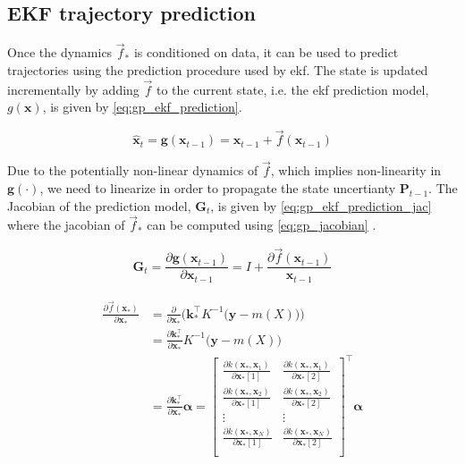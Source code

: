 \subsection{EKF trajectory prediction}
Once the dynamics $\vec{f}_*$ is conditioned on data, it can be used to predict trajectories using the prediction procedure used by \acrshort{ekf}. 
The state is updated incrementally by adding $\vec{f}$ to the current state, i.e. the \acrshort{ekf} prediction model, $g(\boldsymbol{x})$, is given by \cref{eq:gp_ekf_prediction}.

\begin{equation}\label{eq:gp_ekf_prediction}
    \hat{\boldsymbol{x}}_{t} = \boldsymbol{g}(\boldsymbol{x}_{t-1}) = \boldsymbol{x}_{t-1} + \vec{f}(\boldsymbol{x}_{t-1})
\end{equation}

Due to the potentially non-linear dynamics of $\vec{f}$, which implies non-linearity in $\boldsymbol{g}(\cdot)$, we need to linearize in order to propagate the state uncertianty $\boldsymbol{P}_{t-1}$. The Jacobian of the prediction model, $\boldsymbol{G}_t$, is given by \cref{eq:gp_ekf_prediction_jac} where the jacobian of $\vec{f}_*$ can be computed using \cref{eq:gp_jacobian} \cite{gpekf}. 

\begin{equation}\label{eq:gp_ekf_prediction_jac}
    \boldsymbol{G}_t = \frac{\partial \boldsymbol{g}(\boldsymbol{x}_{t-1})}{\partial \boldsymbol{x}_{t-1}} = I + \frac{\partial \vec{f}(\boldsymbol{x}_{t-1})}{\boldsymbol{x}_{t-1}}
\end{equation}

\begin{align}\label{eq:gp_jacobian}
    \begin{split}
        \frac{\partial \vec{f}(\boldsymbol{x}_*)}{\partial \boldsymbol{x}_*} &= \frac{\partial}{\partial \boldsymbol{x}_*} \bigg(\boldsymbol{k}_*^\intercal K^{-1} \big(\boldsymbol{y} - m(X)\big)\bigg)\\
        &= \frac{\partial \boldsymbol{k}_*^\intercal}{\partial \boldsymbol{x}_*} K^{-1} \big(\boldsymbol{y} - m(X)\big)\\
        &= \frac{\partial \boldsymbol{k}_*^\intercal}{\partial \boldsymbol{x}_*} \boldsymbol{\alpha} = \begin{bmatrix}
            \frac{\partial k(\boldsymbol{x}_*, \boldsymbol{x}_1)}{\partial \boldsymbol{x}_*[1]} & \frac{\partial k(\boldsymbol{x}_*, \boldsymbol{x}_1)}{\partial \boldsymbol{x}_*[2]} \\
            \frac{\partial k(\boldsymbol{x}_*, \boldsymbol{x}_2)}{\partial \boldsymbol{x}_*[1]} & \frac{\partial k(\boldsymbol{x}_*, \boldsymbol{x}_2)}{\partial \boldsymbol{x}_*[2]} \\
            \vdots & \vdots \\
            \frac{\partial k(\boldsymbol{x}_*, \boldsymbol{x}_N)}{\partial \boldsymbol{x}_*[1]} & \frac{\partial k(\boldsymbol{x}_*, \boldsymbol{x}_N)}{\partial \boldsymbol{x}_*[2]} \\
        \end{bmatrix}^\intercal \boldsymbol{\alpha}
    \end{split}
\end{align}

